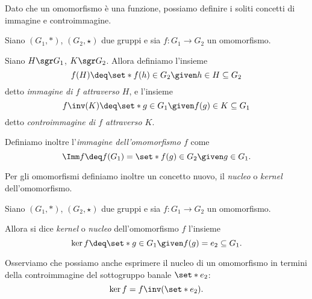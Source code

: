 Dato che un omomorfismo è una funzione, possiamo definire i soliti concetti di immagine e controimmagine.

\begin{definition}
     \label{def:omo_imm_controimm}
    Siano $(G_1, *)$, $(G_2, \star)$ due gruppi e sia $f : G_1 \to G_2$ un omomorfismo.

    Siano $H \sgr G_1$, $K \sgr G_2$. Allora definiamo l'insieme \[
        f(H) \deq \set*{f(h) \in G_2 \given h \in H} \subseteq G_2    
    \] detto \emph{immagine di $f$ attraverso $H$}, e l'insieme \[
        f\inv(K) \deq \set*{g \in G_1 \given f(g) \in K} \subseteq G_1
    \] detto \emph{controimmagine di $f$ attraverso $K$}.

    Definiamo inoltre l'\emph{immagine dell'omomorfismo $f$} come \[
        \Imm f \deq f(G_1) = \set*{f(g) \in G_2 \given g \in G_1}.     
    \]
\end{definition}

Per gli omomorfismi definiamo inoltre un concetto nuovo, il \emph{nucleo} o \emph{kernel} dell'omomorfismo.

\begin{definition}
     \label{def:kernel_omo}
    Siano $(G_1, *)$, $(G_2, \star)$ due gruppi e sia $f : G_1 \to G_2$ un omomorfismo.

    Allora si dice \emph{kernel} o \emph{nucleo} dell'omomorfismo $f$ l'insieme \[
        \ker f \deq \set*{g \in G_1 \given f(g) = e_2} \subseteq G_1.    
    \]
\end{definition}

Osserviamo che possiamo anche esprimere il nucleo di un omomorfismo in termini della controimmagine del sottogruppo banale $\set*{e_2}$: \[
    \ker f = f\inv(\set*{e_2}).
\]

